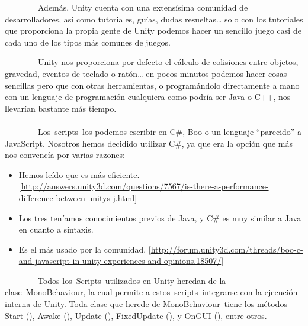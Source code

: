 \documentclass[]{article}
\begin{document}
~~~~~~~~Además, Unity cuenta con una extensísima comunidad de
desarrolladores, así como tutoriales, guías, dudas resueltas\ldots{}
solo con los tutoriales que proporciona la propia gente de Unity podemos
hacer un sencillo juego casi de cada uno de los tipos más comunes de
juegos.

~~~~~~~~Unity nos proporciona por defecto el cálculo de colisiones entre
objetos, gravedad, eventos de teclado o ratón\ldots{} en pocos minutos
podemos hacer cosas sencillas pero que con otras herramientas, o
programándolo directamente a mano con un lenguaje de programación
cualquiera como podría ser Java o C++, nos llevarían bastante más
tiempo.

\paragraph{}\label{h.sl0g53rzcit}


~~~~~~~~Los~scripts~los podemos escribir en C\#, Boo o un lenguaje
``parecido'' a JavaScript. Nosotros hemos decidido utilizar C\#, ya que
era la opción que más nos convencía por varias razones:

\begin{itemize}
\itemsep1pt\parskip0pt
\item
  Hemos leído que es más eficiente.
  {[}\href{https://www.google.com/url?q=http://answers.unity3d.com/questions/7567/is-there-a-performance-difference-between-unitys-j.html\&sa=D\&ust=1464799690077000\&usg=AFQjCNGmmgnF39Uu5qMADlO87GMttS0Q5Q}{http://answers.unity3d.com/questions/7567/is-there-a-performance-difference-between-unitys-j.html}{]}
\item
  Los tres teníamos conocimientos previos de Java, y C\# es muy similar
  a Java en cuanto a sintaxis.
\item
  Es el más usado por la comunidad.
  {[}\href{https://www.google.com/url?q=http://forum.unity3d.com/threads/boo-c-and-javascript-in-unity-experiences-and-opinions.18507/\&sa=D\&ust=1464799690080000\&usg=AFQjCNESW4HtOPW0LsIGsCR-C3rJQjk-YA}{http://forum.unity3d.com/threads/boo-c-and-javascript-in-unity-experiences-and-opinions.18507/}{]}
\end{itemize}

~~~~~~~~Todos los~Scripts~utilizados en Unity heredan de la
clase~MonoBehaviour, la cual permite a estos~scripts~integrarse con la
ejecución interna de Unity. Toda clase que herede de MonoBehaviour~tiene
los métodos Start (), Awake (), Update (), FixedUpdate (), y OnGUI (),
entre otros.
\end{document}
